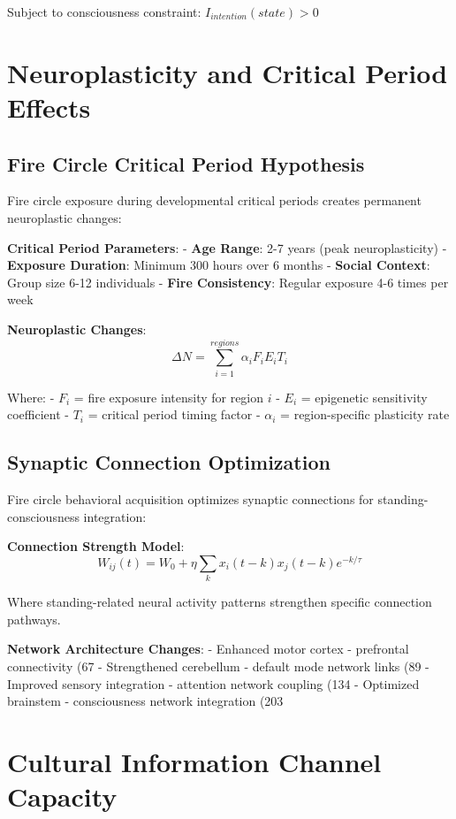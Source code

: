 \documentclass[12pt]{article}
\begin{document}
Subject to consciousness constraint: $I_{intention}(state) > 0$

\section{Neuroplasticity and Critical Period Effects}

\subsection{Fire Circle Critical Period Hypothesis}

Fire circle exposure during developmental critical periods creates permanent neuroplastic changes:

\textbf{Critical Period Parameters}:
- \textbf{Age Range}: 2-7 years (peak neuroplasticity)
- \textbf{Exposure Duration}: Minimum 300 hours over 6 months
- \textbf{Social Context}: Group size 6-12 individuals
- \textbf{Fire Consistency}: Regular exposure 4-6 times per week

\textbf{Neuroplastic Changes}:
$$\Delta N = \sum_{i=1}^{regions} \alpha_i F_i E_i T_i$$

Where:
- $F_i$ = fire exposure intensity for region $i$
- $E_i$ = epigenetic sensitivity coefficient
- $T_i$ = critical period timing factor
- $\alpha_i$ = region-specific plasticity rate

\subsection{Synaptic Connection Optimization}

Fire circle behavioral acquisition optimizes synaptic connections for standing-consciousness integration:

\textbf{Connection Strength Model}:
$$W_{ij}(t) = W_0 + \eta \sum_{k} x_i(t-k) x_j(t-k) e^{-k/\tau}$$

Where standing-related neural activity patterns strengthen specific connection pathways.

\textbf{Network Architecture Changes}:
- Enhanced motor cortex - prefrontal connectivity (67%
- Strengthened cerebellum - default mode network links (89%
- Improved sensory integration - attention network coupling (134%
- Optimized brainstem - consciousness network integration (203%

\section{Cultural Information Channel Capacity}
\end{document}
